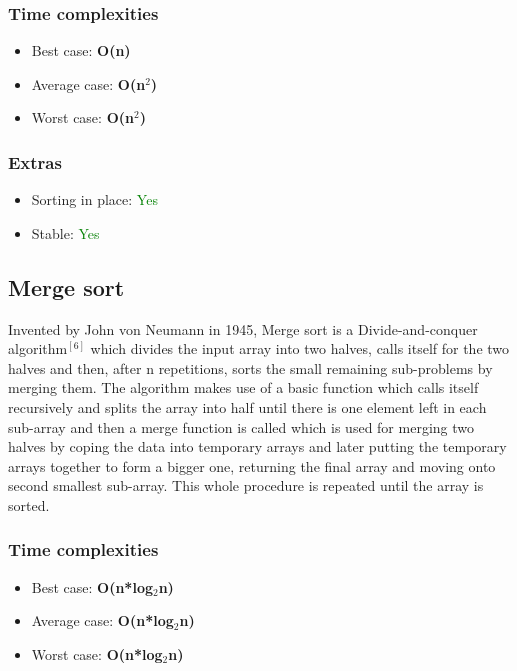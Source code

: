 \documentclass{article}
\begin{document}
\begin{multicols}{2}
\subsubsection{Time complexities}
\begin{itemize}
    \item Best case: \textbf{O(n)}
    \item Average case: \textbf{O(n$^2$)}
    \item Worst case: \textbf{O(n$^2$)}
\end{itemize}

\subsubsection{Extras}
\begin{itemize}
    \item Sorting in place: \textcolor{green}{Yes}
    \item Stable: \textcolor{green}{Yes}
\end{itemize}


\bigbreak \bigbreak \bigbreak \bigbreak \bigbreak \bigbreak \bigbreak \bigbreak


\subsection{Merge sort}
Invented by John von Neumann in 1945, Merge sort is a Divide-and-conquer algorithm$^{[6]}$ which divides the input array into two halves, calls itself for the two halves and then, after n repetitions, sorts the small remaining sub-problems by merging them. The algorithm makes use of a basic function which calls itself recursively and splits the array into half until there is one element left in each sub-array and then a merge function is called which is used for merging two halves by coping the data into temporary arrays and later putting the temporary arrays together to form a bigger one, returning the final array and moving onto second smallest sub-array. This whole procedure is repeated until the array is sorted. 

\subsubsection{Time complexities}
\begin{itemize}
    \item Best case: \textbf{O(n*log$_2$n)}
    \item Average case: \textbf{O(n*log$_2$n)}
    \item Worst case: \textbf{O(n*log$_2$n)}
\end{itemize}


\end{multicols}
\end{document}
